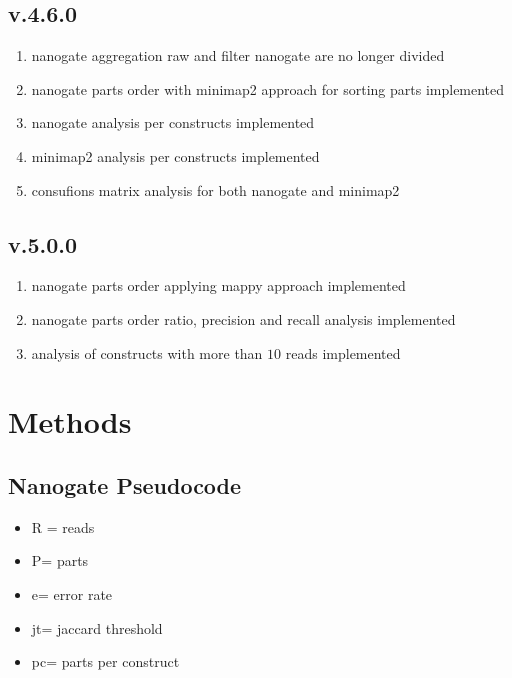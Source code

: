 \documentclass[11pt, a4paper]{article}
\begin{document}
\subsection{v.4.6.0}
\begin{enumerate}
\item nanogate aggregation raw and filter nanogate are no longer divided
\item nanogate parts order with minimap2 approach for sorting parts implemented
\item nanogate analysis per constructs implemented
\item minimap2 analysis per constructs implemented
\item consufions matrix analysis for both nanogate and minimap2
\end{enumerate}

\subsection{v.5.0.0}
\begin{enumerate}
\item nanogate parts order applying mappy approach implemented
\item nanogate parts order ratio, precision and recall analysis implemented 
\item analysis of constructs with more than $10$ reads implemented
\end{enumerate}

\section{Methods}

\subsection{Nanogate Pseudocode}
\begin{itemize}
    \item R = reads
    \item P= parts
    \item e= error rate
    \item jt= jaccard threshold
    \item pc= parts per construct
\end{itemize}
\end{document}
